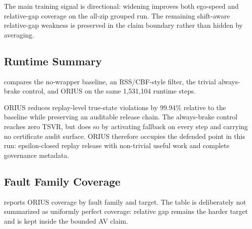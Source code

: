 The main training signal is directional: widening improves both ego-speed and
relative-gap coverage on the all-zip grouped run.  The remaining shift-aware
relative-gap weakness is preserved in the claim boundary rather than hidden by
averaging.

\subsection{Runtime Summary}

 compares the no-wrapper baseline, an RSS/CBF-style filter,
the trivial always-brake control, and ORIUS on the same 1{,}531{,}104 runtime steps.

\begin{table}[h]
\caption{All-zip grouped nuPlan runtime summary.}
\label{tab:av_runtime}
\centering\scriptsize
{}
\end{table}

ORIUS reduces replay-level true-state violations by 99.94\% relative to the baseline
while preserving an auditable release chain.  The always-brake control reaches zero
TSVR, but does so by activating fallback on every step and carrying no certificate
audit surface.  ORIUS therefore occupies the defended point in this run: epsilon-closed
replay release with non-trivial useful work and complete governance metadata.

\subsection{Fault Family Coverage}

 reports ORIUS coverage by fault family and target.  The table is
deliberately not summarized as uniformly perfect coverage: relative gap remains the
harder target and is kept inside the bounded AV claim.

